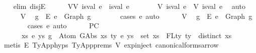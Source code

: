 \begin{isabellebody}
\ \ \isamarkupfalse%
\ {\isacharparenleft}{\kern0pt}elim\ disjE{\isacharparenright}{\kern0pt}\isanewline
\ \ \ \ \isamarkupfalse%
\ VV{\isacharcolon}{\kern0pt}\ {\isachardoublequoteopen}is{\isacharunderscore}{\kern0pt}val\ e{}\ {\isasymand}\ is{\isacharunderscore}{\kern0pt}val\ e{}{\isachardoublequoteclose}\isanewline
\ \ \ \ \isamarkupfalse%
\ \isamarkupfalse%
\ V{}{\isacharcolon}{\kern0pt}\ {\isachardoublequoteopen}is{\isacharunderscore}{\kern0pt}val\ e{}{\isachardoublequoteclose}\ \ V{}{\isacharcolon}{\kern0pt}\ {\isachardoublequoteopen}is{\isacharunderscore}{\kern0pt}val\ e{}{\isachardoublequoteclose}\ \isamarkupfalse%
\ auto\isanewline
\isanewline
\ \ \ \ \isamarkupfalse%
\ V{}\ \isamarkupfalse%
\ g{}\ \ E{}{\isacharcolon}{\kern0pt}\ {\isachardoublequoteopen}e{}\ {\isacharequal}{\kern0pt}\ Graph\ g{}{\isachardoublequoteclose}\isanewline
\ \ \ \ \ \ \isamarkupfalse%
\ {\isacharparenleft}{\kern0pt}cases\ e{}{\isacharparenright}{\kern0pt}\ auto\isanewline
\ \ \ \ \isamarkupfalse%
\ V{}\ \isamarkupfalse%
\ g{}\ \ E{}{\isacharcolon}{\kern0pt}\ {\isachardoublequoteopen}e{}\ {\isacharequal}{\kern0pt}\ Graph\ g{}{\isachardoublequoteclose}\isanewline
\ \ \ \ \ \ \isamarkupfalse%
\ {\isacharparenleft}{\kern0pt}cases\ e{}{\isacharparenright}{\kern0pt}\ auto\isanewline
\isanewline
\ \ \ \ \isamarkupfalse%
\ P{}C{\isacharcolon}{\kern0pt}\isanewline
\ \ \ \ \ \ {\isachardoublequoteopen}{\isasymexists}xs\ e{\isacharprime}{\kern0pt}\ ys{\isachardot}{\kern0pt}\ g{}\ {\isasymsimeq}\ Atom\ {\isacharparenleft}{\kern0pt}GAbs\ xs\ ty{}\ e{\isacharprime}{\kern0pt}{\isacharparenright}{\kern0pt}\ ys\ {\isasymand}\ set\ xs\ {\isacharequal}{\kern0pt}\ FLty\ ty{}\ {\isasymand}\ distinct\ xs{\isachardoublequoteclose}\isanewline
\ \ \ \ \ \isamarkupfalse%
\ {\isacharparenleft}{\kern0pt}metis\ E{}\ TyApp{\isachardot}{\kern0pt}hyps{\isacharparenleft}{\kern0pt}{}{\isacharparenright}{\kern0pt}\ TyApp{\isachardot}{\kern0pt}prems\ V{}\ exp{\isachardot}{\kern0pt}inject{\isacharparenleft}{\kern0pt}{}{\isacharparenright}{\kern0pt}\ canonical{\isacharunderscore}{\kern0pt}forms{\isacharunderscore}{\kern0pt}arrow{\isacharparenright}{\kern0pt}\isanewline

\end{isabellebody}
